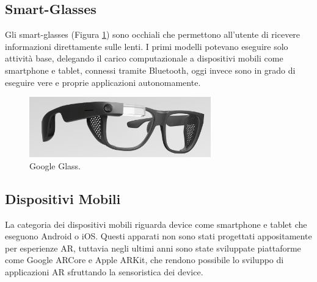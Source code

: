 \subsection{Smart-Glasses}
Gli smart-glasses (Figura \ref{fig:figure19}) sono occhiali che permettono all’utente di ricevere informazioni direttamente sulle lenti.
I primi modelli potevano eseguire solo attività base, delegando il carico computazionale a dispositivi mobili come smartphone e tablet, connessi tramite Bluetooth, oggi invece sono in grado di eseguire vere e proprie applicazioni autonomamente.

\begin{figure}[H]
    \centering
    \includegraphics[width=0.7\textwidth]{images/smart-glass.jpg}
    \caption{Google Glass.}
    \label{fig:figure19}
\end{figure}

\subsection{Dispositivi Mobili}
La categoria dei dispositivi mobili riguarda device come smartphone e tablet che eseguono Android o iOS.
Questi apparati non sono stati progettati appositamente per esperienze AR, tuttavia negli ultimi anni sono state sviluppate piattaforme come Google ARCore e Apple ARKit, che rendono possibile lo sviluppo di applicazioni AR sfruttando la sensoristica dei device.

